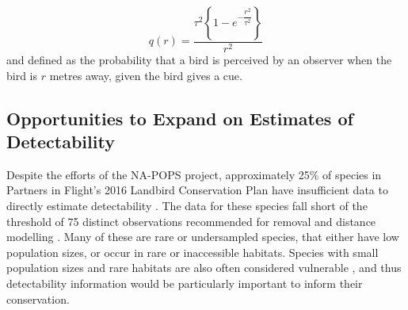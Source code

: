\documentclass[12pt]{article}
\begin{document}
\begin{equation}\label{eq:perceptibility}
	q(r) = \dfrac{\tau^2 \left\{1 - e^{-\dfrac{r^2}{\tau^2}}\right\}}{r^2}
\end{equation}
and defined as the probability that a bird is perceived by an observer when the bird is $r$ metres away, given the bird gives a cue.

\subsection{Opportunities to Expand on Estimates of Detectability}

\par Despite the efforts of the NA-POPS project, approximately 25\% of species in Partners in Flight’s 2016 Landbird Conservation Plan \citep{rosenberg_partners_2016} have insufficient data to directly estimate detectability \citep{edwards_point_2023}.
The data for these species fall short of the threshold of 75 distinct observations recommended for removal and distance modelling \citep{buckland_introduction_2001, solymos_calibrating_2013}. 
Many of these are rare or undersampled species, that either have low population sizes, or occur in rare or inaccessible habitats.
Species with small population sizes and rare habitats are also often considered vulnerable \citep{davies_synergistic_2004, gray_effects_1989, segura_specialist_2007}, and thus detectability information would be particularly important to inform their conservation.
\end{document}
